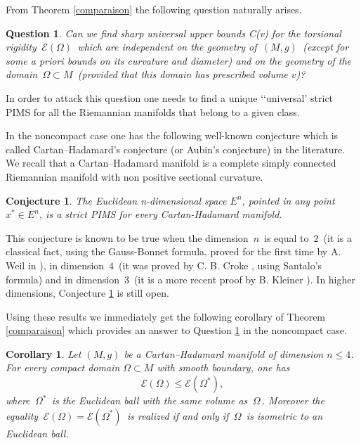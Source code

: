 \documentclass[11pt, reqno]{amsart}
\newtheorem{corollaire}[theoreme]{Corollary}
\newtheorem{conjecture}{Conjecture}
\newtheorem{question}[theoreme]{Question}
\theoremstyle{plain}
\begin{document}
From Theorem \ref{comparaison} the following question naturally arises.

\begin{question}\label{question3}
Can we find sharp universal upper bounds C(v) for 
the torsional rigidity $\,{\mathcal E} (\Omega) \,$  which are
independent on the geometry of $\,(M,g)\,$ (except for some a priori bounds on its 
curvature and diameter) and on the geometry of the domain $\,\Omega \subset M\,$ (provided
that this domain has prescribed volume $v$)?
\end{question}

In order to attack this question one needs to find a unique \lq\lq universal'  strict PIMS for all the Riemannian manifolds that belong to a given class.

\vskip 0.3cm

In the noncompact case one has the following  well-known conjecture which is called Cartan--Hadamard's conjecture (or Aubin's conjecture) in the literature. We recall that a 
 Cartan--Hadamard manifold is  a complete  simply connected Riemannian manifold with non positive sectional curvature. 

\begin{conjecture}\label{Croke}
The Euclidean n-dimensional space $E^n$, pointed in any point $x^* \in E^n$, is a
strict PIMS  for every Cartan-Hadamard manifold.
\end{conjecture}

This conjecture is known to be true when the dimension $\,n \,$ is equal to $\,2\,$
(it is a classical fact, using the Gauss-Bonnet formula, proved for the first time by A. Weil in \cite{Weil}),
in dimension $\,4\,$ (it was proved by C. B. Croke \cite{Cr}, using Santalo's formula) and in dimension
$\,3\,$ (it is a more recent proof by B. Kleiner \cite{Kl}).  In higher dimensions, Conjecture \ref{Croke} is still open.

Using  these results  
we immediately get the following corollary
of  Theorem \ref{comparaison} which provides an answer to Question \ref{question3} in the noncompact case.

\begin{corollaire}\label{comparaisonCroke}
Let $(M, g)$ be a  Cartan--Hadamard manifold of  dimension $n\le 4$.
For every compact domain $\Omega\subset M$ with smooth boundary, one has 
$${\mathcal E} (\Omega) \le {\mathcal E} (\Omega^*),$$
where $\,\Omega^*\,$ is the Euclidean ball with the same volume as $\,\Omega\,$.
Moreover the equality $\,{\mathcal E} (\Omega) = {\mathcal E} (\Omega^*)\,$ is realized if and only if 
$\,\Omega\,$ is isometric to an Euclidean ball. 
\end{corollaire}
\end{document}
